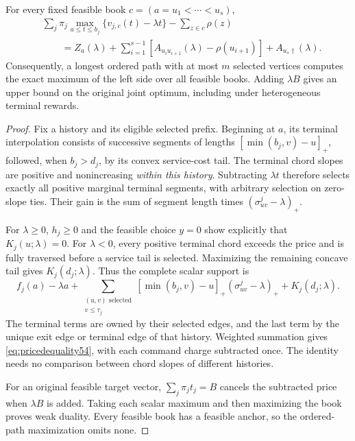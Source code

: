 \begin{theorem}\label{thm:price54}
For every fixed feasible book $c=(a=u_1<\cdots<u_s)$,
\begin{equation}\label{eq:pricedequality54}
 \begin{split}
 &\sum_j\pi_j\max_{a\leq t\leq b_j}\{v_{j,c}(t)-\lambda t\}-\sum_{z\in c}\rho(z)\\
 &\qquad=Z_a(\lambda)+\sum_{i=1}^{s-1}[A_{u_i u_{i+1}}(\lambda)-\rho(u_{i+1})]+A_{u_s\dagger}(\lambda).
\end{split}
\end{equation}
Consequently, a longest ordered path with at most $m$ selected vertices computes the exact maximum of the left side over all feasible books. Adding $\lambda B$ gives an upper bound on the original joint optimum, including under heterogeneous terminal rewards.
\end{theorem}
\begin{proof}
Fix a history and its eligible selected prefix. Beginning at $a$, its terminal interpolation consists of successive segments of lengths $[\min(b_j,v)-u]_+$, followed, when $b_j>d_j$, by its convex service-cost tail. The terminal chord slopes are positive and nonincreasing \emph{within this history}. Subtracting $\lambda t$ therefore selects exactly all positive marginal terminal segments, with arbitrary selection on zero-slope ties. Their gain is the sum of segment length times $(\sigma^j_{uv}-\lambda)_+$.

For $\lambda\geq0$, $h_j\geq0$ and the feasible choice $y=0$ show explicitly that $K_j(u;\lambda)=0$. For $\lambda<0$, every positive terminal chord exceeds the price and is fully traversed before a service tail is selected. Maximizing the remaining concave tail gives $K_j(d_j;\lambda)$. Thus the complete scalar support is
\[
 f_j(a)-\lambda a+
 \sum_{\substack{(u,v)\text{ selected}\\v\leq\tau_j}}
 [\min(b_j,v)-u]_+(\sigma^j_{uv}-\lambda)_+ +K_j(d_j;\lambda).
\]
The terminal terms are owned by their selected edges, and the last term by the unique exit edge or terminal edge of that history. Weighted summation gives \eqref{eq:pricedequality54}, with each command charge subtracted once. The identity needs no comparison between chord slopes of different histories.

For an original feasible target vector, $\sum_j\pi_jt_j=B$ cancels the subtracted price when $\lambda B$ is added. Taking each scalar maximum and then maximizing the book proves weak duality. Every feasible book has a feasible anchor, so the ordered-path maximization omits none.
\end{proof}

